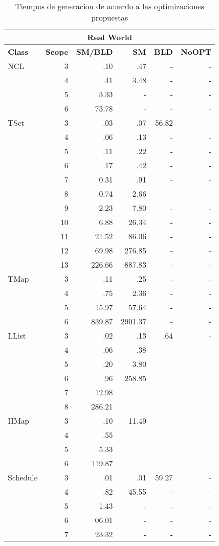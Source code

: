 \begin{table}[H]
\scriptsize

\centering
\begin{tabular}{ l r | r | r | r | r  }
  \toprule
  \multicolumn{6}{c}{\textbf{Real World}} \\
  \midrule 
  \textbf{Class} & \textbf{Scope} & \textbf{SM/BLD} & \textbf{SM}  & \textbf{BLD} & \textbf{NoOPT}  \\
  \midrule
  NCL
&	3	&	.10	&	.47	&	-	&	-	\\
&	4	&	.41	&	3.48	&	-	&	-	\\
&	5	&	3.33	&	-	&	-	&	-	\\
&	6	&	73.78	&	-	&	-	&	-	\\
  \midrule
  TSet
&	3	&	.03	&	.07	&	56.82	&	-	\\
&	4	&	.06	&	.13	&	-	&	-	\\
&	5	&	.11	&	.22	&	-	&	-	\\
&	6	&	.17	&	.42	&	-	&	-	\\
&	7	&	0.31	&	.91	&	-	&	-	\\
&	8	&	0.74	&	2.66	&	-	&	-	\\
&	9	&	2.23	&	7.80	&	-	&	-	\\
&	10	&	6.88	&	26.34	&	-	&	-	\\
&	11	&	21.52	&	86.06	&	-	&	-	\\
&	12	&	69.98	&	276.85	&	-	&	-	\\
&	13	&	226.66	&	887.83	&	-	&	-	\\
    \midrule
  TMap
&	3	&	.11	&	.25	&	-	&	-	\\
&	4	&	.75	&	2.36	&	-	&	-	\\
&	5	&	15.97	&	57.64	&	-	&	-	\\
&	6	&	839.87	&	2901.37	&	-	&	-	\\
  \midrule
  LList
&	3	&	.02	&	.13	&	.64	&	-	\\
&	4	&	.06	&	.38	&		&		\\
&	5	&	.20	&	3.80	&		&		\\
&	6	&	.96	&	258.85	&		&		\\
&	7	&	12.98	&		&		&		\\
&	8	&	286.21	&		&		&		\\
  \midrule
  HMap
&	3	&	.10	&	11.49	&	-	&	-	\\
&	4	&	.55	&		&		&		\\
&	5	&	5.33	&		&		&		\\
&	6	&	119.87	&		&		&		\\
  \midrule
  Schedule
&	3	&	.01	&	.01	&	59.27	&	-	\\
&	4	&	.82	&	45.55	&	-	&	-	\\
&	5	&	1.43	&	-	&	-	&	-	\\
&	6	&	06.01	&	-	&	-	&	-	\\
&	7	&	23.32	&	-	&	-	&	-	\\
  \bottomrule

\end{tabular}
\caption{Tiempos de generacion de acuerdo a las optimizaciones propuestas}
\label{tab:results-realWorld}



\end{table}
